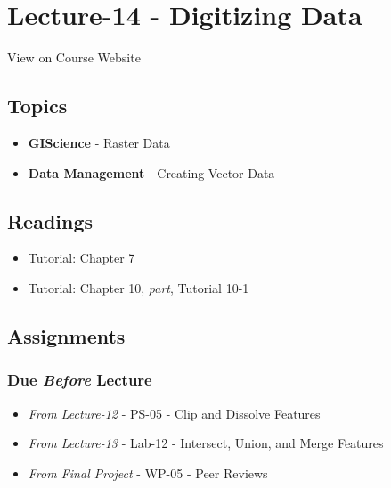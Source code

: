 \documentclass[]{book}
\providecommand{\tightlist}{%
  \setlength{\itemsep}{0pt}\setlength{\parskip}{0pt}}
\begin{document}
\hypertarget{lecture-14---digitizing-data}{%
\section*{Lecture-14 - Digitizing Data}\label{lecture-14---digitizing-data}}

View on Course Website

\hypertarget{topics-14}{%
\subsection*{Topics}\label{topics-14}}

\begin{itemize}
\tightlist
\item
  \textbf{GIScience} - Raster Data
\item
  \textbf{Data Management} - Creating Vector Data
\end{itemize}

\hypertarget{readings-14}{%
\subsection*{Readings}\label{readings-14}}

\begin{itemize}
\tightlist
\item
  Tutorial: Chapter 7
\item
  Tutorial: Chapter 10, \emph{part}, Tutorial 10-1
\end{itemize}

\hypertarget{assignments-15}{%
\subsection*{Assignments}\label{assignments-15}}

\hypertarget{due-before-lecture-13}{%
\subsubsection*{\texorpdfstring{Due \emph{Before} Lecture}{Due Before Lecture}}\label{due-before-lecture-13}}

\begin{itemize}
\tightlist
\item
  \emph{From Lecture-12} - PS-05 - Clip and Dissolve Features
\item
  \emph{From Lecture-13} - Lab-12 - Intersect, Union, and Merge Features
\item
  \emph{From Final Project} - WP-05 - Peer Reviews
\end{itemize}
\end{document}
